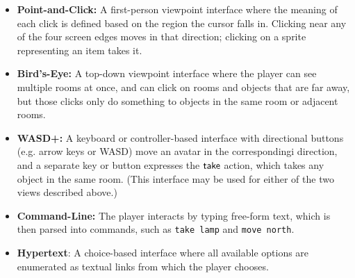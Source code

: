   \begin{itemize}
   \item {\bf Point-and-Click:} A first-person viewpoint interface where the
     meaning of each click is defined based on the region the cursor falls
     in. Clicking near any of the four screen edges moves in that
     direction; clicking on a sprite representing an item takes it.
  \item {\bf Bird's-Eye:} A top-down viewpoint interface where the player can see multiple
    rooms at once, and can click on rooms and objects that are far away,
    but those clicks only do something to objects in the same room or
    adjacent rooms.
  \item {\bf WASD+:} A keyboard or controller-based interface with
    directional buttons (e.g. arrow keys or WASD) move an avatar in the
    correspondingi direction, and a separate key or button expresses
    the $\mathsf{take}$ action, which takes any object in the same room. (This
    interface may be used for either of the two views described above.)
  \item{\bf Command-Line:} The player interacts by typing free-form text, 
    which is then parsed into commands, such as \verb|take lamp| and \verb|move north|.
  \item{\bf Hypertext}: A choice-based interface where all available options are
    enumerated as textual links from which the player chooses.
  \end{itemize}


